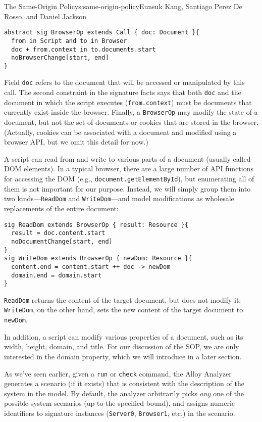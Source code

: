 \begin{aosachapter}{The Same-Origin Policy}{s:same-origin-policy}{Eunsuk Kang, Santiago Perez De Rosso, and Daniel Jackson}
\begin{verbatim}
abstract sig BrowserOp extends Call { doc: Document }{
  from in Script and to in Browser
  doc + from.context in to.documents.start
  noBrowserChange[start, end]
}
\end{verbatim}

Field \texttt{doc} refers to the document that will be accessed or
manipulated by this call. The second constraint in the signature facts
says that both \texttt{doc} and the document in which the script
executes (\texttt{from.context}) must be documents that currently exist
inside the browser. Finally, a \texttt{BrowserOp} may modify the state
of a document, but not the set of documents or cookies that are stored
in the browser. (Actually, cookies can be associated with a document and
modified using a browser API, but we omit this detail for now.)

A script can read from and write to various parts of a document (usually
called DOM elements). In a typical browser, there are a large number of
API functions for accessing the DOM (e.g.,
\texttt{document.getElementById}), but enumerating all of them is not
important for our purpose. Instead, we will simply group them into two
kinds---\texttt{ReadDom} and \texttt{WriteDom}---and model modifications
as wholesale replacements of the entire document:

\begin{verbatim}
sig ReadDom extends BrowserOp { result: Resource }{
  result = doc.content.start
  noDocumentChange[start, end]
}
sig WriteDom extends BrowserOp { newDom: Resource }{
  content.end = content.start ++ doc -> newDom
  domain.end = domain.start
}
\end{verbatim}

\texttt{ReadDom} returns the content of the target document, but does
not modify it; \texttt{WriteDom}, on the other hand, sets the new
content of the target document to \texttt{newDom}.

In addition, a script can modify various properties of a document, such
as its width, height, domain, and title. For our discussion of the SOP,
we are only interested in the domain property, which we will introduce
in a later section.

\label{example-applications}

As we've seen earlier, given a \texttt{run} or \texttt{check} command,
the Alloy Analyzer generates a scenario (if it exists) that is
consistent with the description of the system in the model. By default,
the analyzer arbitrarily picks \emph{any} one of the possible system
scenarios (up to the specified bound), and assigns numeric identifiers
to signature instances (\texttt{Server0}, \texttt{Browser1}, etc.) in
the scenario.


\end{aosachapter}
